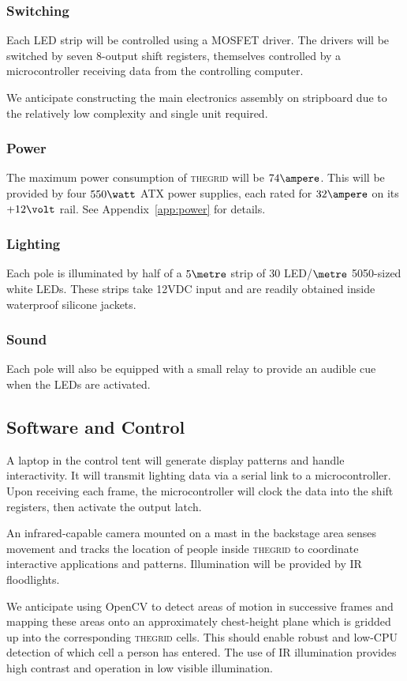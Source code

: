 \documentclass[12pt]{article} %
\newcommand{\thegrid}{\textsc{the\textperiodcentered grid}\xspace}
\begin{document}
\subsubsection{Switching}
Each LED strip will be controlled using a MOSFET driver.  The drivers will be
switched by seven 8-output shift registers, themselves controlled by a
microcontroller receiving data from the controlling computer.

We anticipate constructing the main electronics assembly on stripboard due to
the relatively low complexity and single unit required.


\subsubsection{Power}
The maximum power consumption of \thegrid will be $74\ampere$.  This will be
provided by four $550\watt$ ATX power supplies, each rated for $32\ampere$ on
its $+12\volt$ rail.  See Appendix~\ref{app:power} for details.

\subsubsection{Lighting}
Each pole is illuminated by half of a $5\metre$ strip of 30 LED/$\metre$
5050-sized white LEDs. These strips take 12VDC input and are readily obtained
inside waterproof silicone jackets.

\subsubsection{Sound}
Each pole will also be equipped with a small relay to provide an audible cue
when the LEDs are activated.

\subsection{Software and Control}
A laptop in the control tent will generate display patterns and handle
interactivity.  It will transmit lighting data via a serial link to a
microcontroller.  Upon receiving each frame, the microcontroller will clock the
data into the shift registers, then activate the output latch.

An infrared-capable camera mounted on a mast in the backstage area senses
movement and tracks the location of people inside \thegrid to coordinate
interactive applications and patterns.  Illumination will be provided by IR
floodlights.

We anticipate using OpenCV to detect areas of motion in successive frames and
mapping these areas onto an approximately chest-height plane which is gridded
up into the corresponding \thegrid cells.  This should enable robust and
low-CPU detection of which cell a person has entered.  The use of IR
illumination provides high contrast and operation in low visible illumination.
\end{document}
